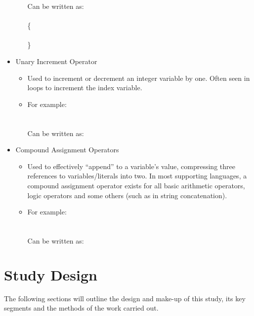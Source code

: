 \documentclass{article}
\begin{document}
\begin{itemize}
\begin{itemize}
                    Can be written as:\\
                    \\
                    \{\\
                    \hspace*{1cm}\\
                    \}
                \end{itemize}
            \item Unary Increment Operator
                \begin{itemize}
                    \item Used to increment or decrement an integer variable by one. Often seen in  loops to increment the index variable.
                    \item For example:\\
                    \\\\
                    Can be written as:\\
                \end{itemize}
            \item Compound Assignment Operators
                \begin{itemize}
                    \item Used to effectively ``append'' to a variable's value, compressing three references to variables/literals into two. In most supporting languages, a compound assignment operator exists for all basic arithmetic operators, logic operators and some others (such as in string concatenation).
                    \item For example:\\
                    \\\\
                    Can be written as:\\
                \end{itemize}
        \end{itemize}
\newpage
\section{Study Design}
    The following sections will outline the design and make-up of this study, its key segments and the methods of the work carried out.
\end{document}
